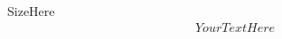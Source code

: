 \documentclass[12pt]{beamer}
\begin{document}
\begin{frame}
    \centering
    SizeHere
    \begin{align*}
        YourTextHere
    \end{align*}
\end{frame}
\end{document}
